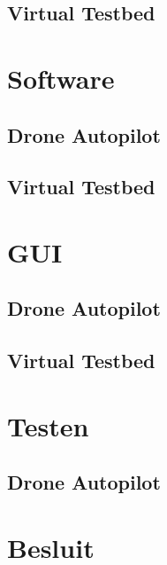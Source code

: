 \documentclass[tt]{penoverslag}
\begin{document}
\subsection{Virtual Testbed}



\section{Software}
\label{sec:Software}



\subsection{Drone Autopilot}



\subsection{Virtual Testbed}



\section{GUI}
\label{sec:GUI}



\subsection{Drone Autopilot}



\subsection{Virtual Testbed}



\section{Testen}
\label{sec:Testen}



\subsection{Drone Autopilot}



\section{Besluit}
\label{sec:Besluit}

\end{document}
